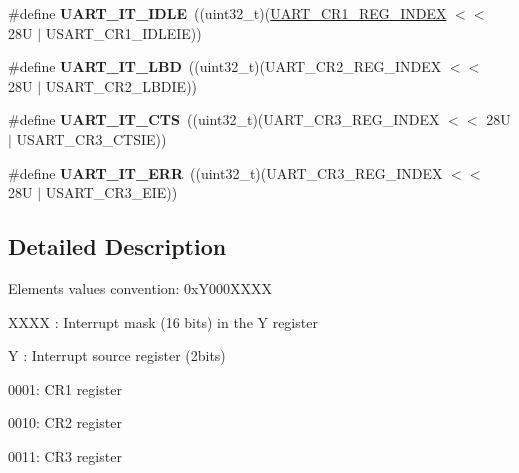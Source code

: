 \begin{DoxyCompactItemize}
\item 
\mbox{\label{group___u_a_r_t___interrupt__definition_ga9781808d4f9999061fc2da36572191d9}} 
\#define {\bfseries U\+A\+R\+T\+\_\+\+I\+T\+\_\+\+I\+D\+LE}~((uint32\+\_\+t)(\mbox{\hyperlink{group___u_a_r_t___private___constants_ga5917bcb19b2dab202b8cbfa82520b93e}{U\+A\+R\+T\+\_\+\+C\+R1\+\_\+\+R\+E\+G\+\_\+\+I\+N\+D\+EX}} $<$$<$ 28\+U $\vert$ U\+S\+A\+R\+T\+\_\+\+C\+R1\+\_\+\+I\+D\+L\+E\+I\+E))
\item 
\mbox{\label{group___u_a_r_t___interrupt__definition_gabca5e77508dc2dd9aa26fcb683d9b988}} 
\#define {\bfseries U\+A\+R\+T\+\_\+\+I\+T\+\_\+\+L\+BD}~((uint32\+\_\+t)(U\+A\+R\+T\+\_\+\+C\+R2\+\_\+\+R\+E\+G\+\_\+\+I\+N\+D\+EX $<$$<$ 28\+U $\vert$ U\+S\+A\+R\+T\+\_\+\+C\+R2\+\_\+\+L\+B\+D\+I\+E))
\item 
\mbox{\label{group___u_a_r_t___interrupt__definition_ga986d271478550f9afa918262ca642333}} 
\#define {\bfseries U\+A\+R\+T\+\_\+\+I\+T\+\_\+\+C\+TS}~((uint32\+\_\+t)(U\+A\+R\+T\+\_\+\+C\+R3\+\_\+\+R\+E\+G\+\_\+\+I\+N\+D\+EX $<$$<$ 28\+U $\vert$ U\+S\+A\+R\+T\+\_\+\+C\+R3\+\_\+\+C\+T\+S\+I\+E))
\item 
\mbox{\label{group___u_a_r_t___interrupt__definition_ga8eb26d8edd9bf78ae8d3ad87dd51b618}} 
\#define {\bfseries U\+A\+R\+T\+\_\+\+I\+T\+\_\+\+E\+RR}~((uint32\+\_\+t)(U\+A\+R\+T\+\_\+\+C\+R3\+\_\+\+R\+E\+G\+\_\+\+I\+N\+D\+EX $<$$<$ 28\+U $\vert$ U\+S\+A\+R\+T\+\_\+\+C\+R3\+\_\+\+E\+I\+E))
\end{DoxyCompactItemize}


\subsection{Detailed Description}
Elements values convention\+: 0x\+Y000\+X\+X\+XX
\begin{DoxyItemize}
\item X\+X\+XX \+: Interrupt mask (16 bits) in the Y register
\item Y \+: Interrupt source register (2bits)
\begin{DoxyItemize}
\item 0001\+: C\+R1 register
\item 0010\+: C\+R2 register
\item 0011\+: C\+R3 register 
\end{DoxyItemize}
\end{DoxyItemize}